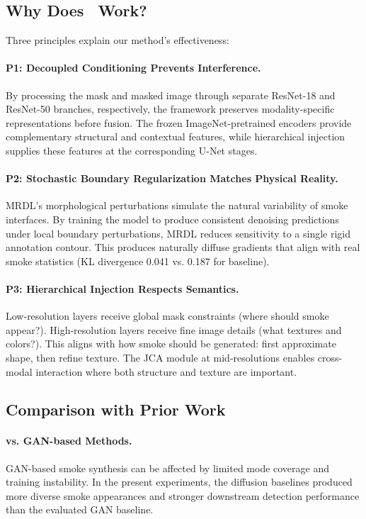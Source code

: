 \documentclass[journal]{IEEEtran}
\begin{document}
\subsection{Why Does \method~Work?}

Three principles explain our method's effectiveness:

\paragraph{P1: Decoupled Conditioning Prevents Interference.}
By processing the mask and masked image through separate ResNet-18 and ResNet-50 branches, respectively, the framework preserves modality-specific representations before fusion. The frozen ImageNet-pretrained encoders provide complementary structural and contextual features, while hierarchical injection supplies these features at the corresponding U-Net stages.

\paragraph{P2: Stochastic Boundary Regularization Matches Physical Reality.}
MRDL's morphological perturbations simulate the natural variability of smoke interfaces. By training the model to produce consistent denoising predictions under local boundary perturbations, MRDL reduces sensitivity to a single rigid annotation contour. This produces naturally diffuse gradients that align with real smoke statistics (KL divergence 0.041 vs. 0.187 for baseline).

\paragraph{P3: Hierarchical Injection Respects Semantics.}
Low-resolution layers receive global mask constraints (where should smoke appear?). High-resolution layers receive fine image details (what textures and colors?). This aligns with how smoke should be generated: first approximate shape, then refine texture. The JCA module at mid-resolutions enables cross-modal interaction where both structure and texture are important.

\subsection{Comparison with Prior Work}

\paragraph{vs. GAN-based Methods.}
GAN-based smoke synthesis \cite{rs12223715} can be affected by limited mode coverage and training instability. In the present experiments, the diffusion baselines produced more diverse smoke appearances and stronger downstream detection performance than the evaluated GAN baseline.
\end{document}
